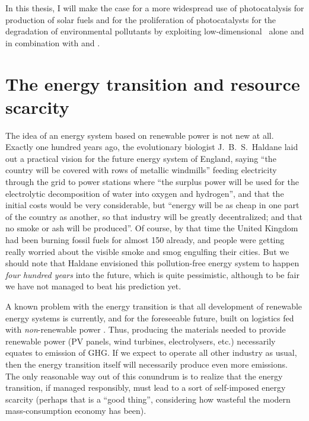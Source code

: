 \documentclass[draft,webedition,openright,titles,swedish,english]{LuaUUThesis}\usepackage[]{graphicx}\usepackage[]{xcolor}
\newcommand{\etc}{etc.}
\begin{document}
In this thesis, I will make the case for a more widespread use of photocatalysis
for production of solar fuels and for the proliferation of photocatalysts for
the degradation of environmental pollutants by exploiting low-dimensional
\ZnO\ alone and in combination with  and .




\section{The energy transition and resource scarcity}
\label{intro:energy-transition}

The idea of an energy system based on renewable power is not new at all.
Exactly one hundred years ago, the evolutionary biologist \mbox{J.\ B.\ S.\ Haldane}
laid out a practical vision for the future energy system of England, saying
\cite{Haldane1923,Rajeshwar2008}
\enquote{the country will be covered with rows of metallic windmills}
feeding electricity through the grid to power stations where
\enquote{the surplus power will be used for the electrolytic decomposition of water
into oxygen and hydrogen}, and that the initial costs would be very considerable,
but \enquote{energy will be as cheap in one part of the country as another, so that
industry will be greatly decentralized; and that no smoke or ash will be produced}.
Of course, by that time the United Kingdom had been burning fossil fuels
for almost \qty{150}{\years} already, and people were getting really
worried about the visible smoke and smog engulfing their cities.
But we should note that Haldane envisioned this pollution-free energy system to
happen \emph{four hundred years} into the future, which is quite pessimistic, although
to be fair we have not managed to beat his prediction yet.

A known problem with the energy transition is that all development of renewable
energy systems is currently, and for the foreseeable future, built on logistics
fed with \emph{non}-renewable power \cite{Roos2021}.
Thus, producing the materials needed to provide renewable power
(\gls{PV} panels, wind turbines, electrolysers, \etc)
necessarily equates to emission of \gls{GHG}.
If we expect to operate all other industry as usual, then the energy transition
itself will necessarily produce even more emissions.
The only reasonable way out of this conundrum is to realize that the energy
transition, if managed responsibly, must lead to a sort of self-imposed energy scarcity
(perhaps that is a \enquote{good thing}, considering how wasteful the modern
mass-consumption economy has been).
\end{document}
